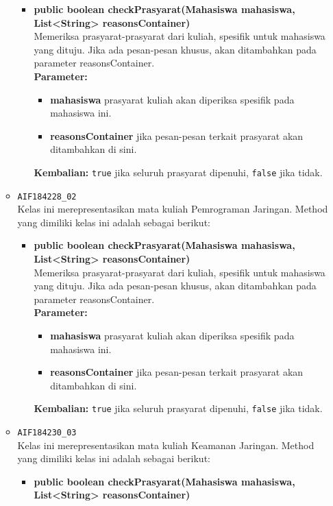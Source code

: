\begin{enumerate}
\begin{itemize}
		\begin{itemize}
			\item \textbf{public boolean checkPrasyarat(Mahasiswa mahasiswa, List<String> reasonsContainer)}\\
			Memeriksa prasyarat-prasyarat dari kuliah, spesifik untuk mahasiswa yang dituju. Jika ada pesan-pesan khusus, akan ditambahkan pada parameter reasonsContainer.\\
			\textbf{Parameter:}
			\begin{itemize}
				\item \textbf{mahasiswa} prasyarat kuliah akan diperiksa spesifik pada mahasiswa ini.
				\item \textbf{reasonsContainer} jika pesan-pesan terkait prasyarat akan ditambahkan di sini.
			\end{itemize}
			\textbf{Kembalian:} \texttt{true} jika seluruh prasyarat dipenuhi, \texttt{false} jika tidak.
		\end{itemize}
		\item \texttt{AIF184228\_02} \\
		Kelas ini merepresentasikan mata kuliah Pemrograman Jaringan. Method yang dimiliki kelas ini adalah sebagai berikut: 
		\begin{itemize}
			\item \textbf{public boolean checkPrasyarat(Mahasiswa mahasiswa, List<String> reasonsContainer)}\\
			Memeriksa prasyarat-prasyarat dari kuliah, spesifik untuk mahasiswa yang dituju. Jika ada pesan-pesan khusus, akan ditambahkan pada parameter reasonsContainer.\\
			\textbf{Parameter:}
			\begin{itemize}
				\item \textbf{mahasiswa} prasyarat kuliah akan diperiksa spesifik pada mahasiswa ini.
				\item \textbf{reasonsContainer} jika pesan-pesan terkait prasyarat akan ditambahkan di sini.
			\end{itemize}
			\textbf{Kembalian:} \texttt{true} jika seluruh prasyarat dipenuhi, \texttt{false} jika tidak.
		\end{itemize}
		\item \texttt{AIF184230\_03} \\
		Kelas ini merepresentasikan mata kuliah Keamanan Jaringan. Method yang dimiliki kelas ini adalah sebagai berikut: 
		\begin{itemize}
			\item \textbf{public boolean checkPrasyarat(Mahasiswa mahasiswa, List<String> reasonsContainer)}\\

\end{itemize}
\end{itemize}
\end{enumerate}
